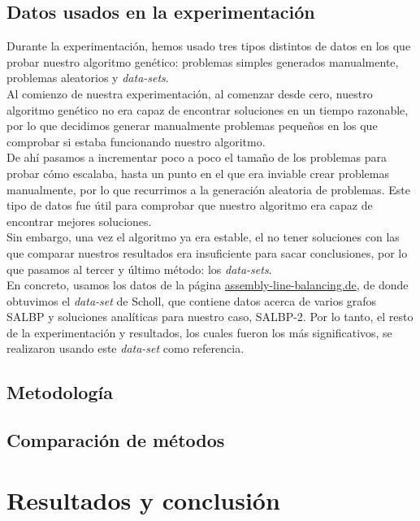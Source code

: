 \documentclass[12pt,a4paper]{report}
\begin{document}
\section{Datos usados en la experimentación}
Durante la experimentación, hemos usado tres tipos distintos de datos en los que probar nuestro algoritmo genético: problemas simples generados manualmente, problemas aleatorios y \textit{data-sets}.\\
Al comienzo de nuestra experimentación, al comenzar desde cero, nuestro algoritmo genético no era capaz de encontrar soluciones en un tiempo razonable, por lo que decidimos generar manualmente problemas pequeños en los que comprobar si estaba funcionando nuestro algoritmo.\\
De ahí pasamos a incrementar poco a poco el tamaño de los problemas para probar cómo escalaba, hasta un punto en el que era inviable crear problemas manualmente, por lo que recurrimos a la generación aleatoria de problemas. Este tipo de datos fue útil para comprobar que nuestro algoritmo era capaz de encontrar mejores soluciones.\\
Sin embargo, una vez el algoritmo ya era estable, el no tener soluciones con las que comparar nuestros resultados era insuficiente para sacar conclusiones, por lo que pasamos al tercer y último método: los \textit{data-sets}.\\
En concreto, usamos los datos de la página \textcolor{blue}{\href{https://assembly-line-balancing.de/salbp/benchmark-data-sets-1993/}{assembly-line-balancing.de}}, de donde obtuvimos el \textit{data-set} de Scholl, que contiene datos acerca de varios grafos SALBP y soluciones analíticas para nuestro caso, SALBP-2. Por lo tanto, el resto de la experimentación y resultados, los cuales fueron los más significativos, se realizaron usando este \textit{data-set} como referencia.
\section{Metodología}
\section{Comparación de métodos}
\chapter{Resultados y conclusión}
\end{document}
